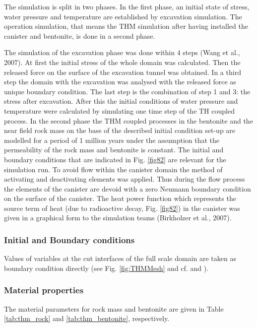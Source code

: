The simulation is split in two phases. In the first phase, an initial state of stress, water pressure and temperature are established by excavation simulation. The operation simulation, that means the THM simulation after having installed the canister and bentonite, is done in a second phase.

The simulation of the excavation phase was done within 4 steps (Wang et al., 2007). At first the initial stress of the whole domain was calculated. Then the released force on the surface of the excavation tunnel was obtained. In a third step the domain with the excavation was analysed with the released force as unique boundary condition. The last step is the combination of step 1 and 3: the stress after excavation. After this the initial conditions of water pressure and temperature were calculated by simulating one time step of the TH coupled process. In the second phase the THM coupled processes in the bentonite and the near field rock mass on the base of the described initial condition set-up are modelled for a period of 1 million years under the assumption that the permeability of the rock mass and bentonite is constant. The initial and boundary conditions that are indicated in Fig. \ref{fig82} are relevant for the simulation run. To avoid flow within the canister domain the method of activating and deactivating elements was applied. Thus during the flow process the elements of the canister are devoid with a zero Neumann boundary condition on the surface of the canister. The heat power function which represents the source term of heat (due to radioactive decay, Fig. \ref{fig82}) in the canister was given in a graphical form to the simulation teams (Birkholzer et al., 2007).

\subsubsection*{Initial and Boundary conditions}
Values of variables at the cut interfaces of the full scale domain are taken as boundary condition directly
 (see Fig. \ref{fig:THMMesh} and cf.  \cite{WXNKHK:05} and \cite{RBCKLOWZ:06}).

\subsubsection*{Material properties}
The material parameters for rock mass and bentonite are given in
Table \ref{tab:thm_rock} and \ref{tab:thm_bentonite},
respectively.

